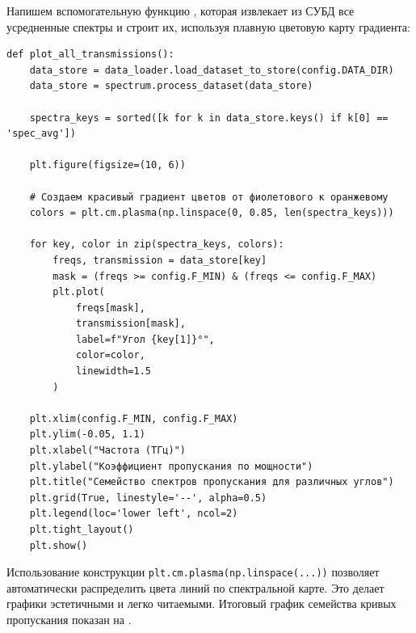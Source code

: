 Напишем вспомогательную функцию , которая извлекает из СУБД все усредненные спектры и строит их, используя плавную цветовую карту градиента:

\begin{listing}[H]
	\caption{Построение семейства кривых пропускания ()}\label{lst:plot_all_trans}
	\begin{verbatim}
def plot_all_transmissions():
    data_store = data_loader.load_dataset_to_store(config.DATA_DIR)
    data_store = spectrum.process_dataset(data_store)

    spectra_keys = sorted([k for k in data_store.keys() if k[0] == 'spec_avg'])

    plt.figure(figsize=(10, 6))

    # Создаем красивый градиент цветов от фиолетового к оранжевому
    colors = plt.cm.plasma(np.linspace(0, 0.85, len(spectra_keys)))

    for key, color in zip(spectra_keys, colors):
        freqs, transmission = data_store[key]
        mask = (freqs >= config.F_MIN) & (freqs <= config.F_MAX)
        plt.plot(
            freqs[mask],
            transmission[mask],
            label=f"Угол {key[1]}°",
            color=color,
            linewidth=1.5
        )

    plt.xlim(config.F_MIN, config.F_MAX)
    plt.ylim(-0.05, 1.1)
    plt.xlabel("Частота (ТГц)")
    plt.ylabel("Коэффициент пропускания по мощности")
    plt.title("Семейство спектров пропускания для различных углов")
    plt.grid(True, linestyle='--', alpha=0.5)
    plt.legend(loc='lower left', ncol=2)
    plt.tight_layout()
    plt.show()
	\end{verbatim}
\end{listing}

Использование конструкции \texttt{plt.cm.plasma(np.linspace(...))} позволяет автоматически распределить цвета линий по спектральной карте. Это делает графики эстетичными и легко читаемыми. Итоговый график семейства кривых пропускания показан на .


